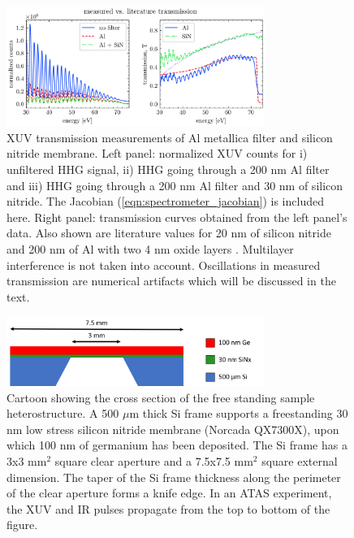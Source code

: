\begin{figure}
	\centering
	\includegraphics[width=0.75\textwidth]{figures/chap3/SiN_Al_transmission.png}
	\caption{XUV transmission measurements of Al metallica filter and silicon nitride membrane. Left panel: normalized XUV counts for i) unfiltered HHG signal, ii) HHG going through a 200 nm Al filter and iii) HHG going through a 200 nm Al filter and 30 nm of silicon nitride. The Jacobian (\cref{eqn:spectrometer_jacobian}) is included here. Right panel: transmission curves obtained from the left panel's data. Also shown are literature values for 20 nm of silicon nitride and 200 nm of Al with two 4 nm oxide layers \cite{gulliksonCXROXRayInteractions}. Multilayer interference is not taken into account. Oscillations in measured transmission are numerical artifacts which will be discussed in the text.}
	\label{fig:SiN_Al_transmission}
\end{figure}

\begin{figure}
	\centering
	\includegraphics[width=0.75\textwidth]{figures/chap3/Sample_Geometry.png}
	\caption{Cartoon showing the cross section of the free standing sample heterostructure. A 500 $\mu$m thick Si frame supports a freestanding 30 nm low stress silicon nitride membrane (Norcada QX7300X), upon which 100 nm of germanium has been deposited. The Si frame has a 3x3 mm$^2$ square clear aperture and a 7.5x7.5 mm$^2$ square external dimension. The taper of the Si frame thickness along the perimeter of the clear aperture forms a knife edge. In an ATAS experiment, the XUV and IR pulses propagate from the top to bottom of the figure.}
	\label{fig:Sample_Geometry}
\end{figure}

